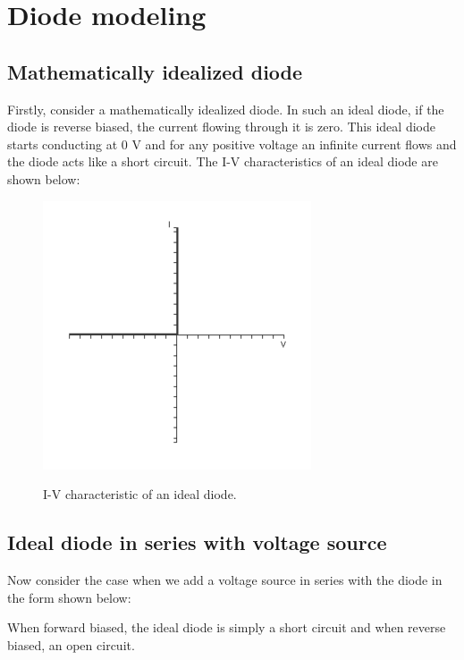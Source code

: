 \section{Diode modeling}

\subsection{Mathematically idealized diode}

Firstly, consider a mathematically idealized diode. In such an ideal diode, if the diode is reverse biased, the current flowing through it is zero. This ideal diode starts conducting at 0 V and for any positive voltage an infinite current flows and the diode acts like a short circuit. The I-V characteristics of an ideal diode are shown below:

\begin{figure}[H]
  \centering
  \includegraphics[width=0.4\linewidth]{figures/Diode_Modelling_Image5.png}
  \label{fig:}
  \caption{I-V characteristic of an ideal diode.}
\end{figure}

\subsection{Ideal diode in series with voltage source}

Now consider the case when we add a voltage source in series with the diode in the form shown below:

When forward biased, the ideal diode is simply a short circuit and when reverse biased, an open circuit.

